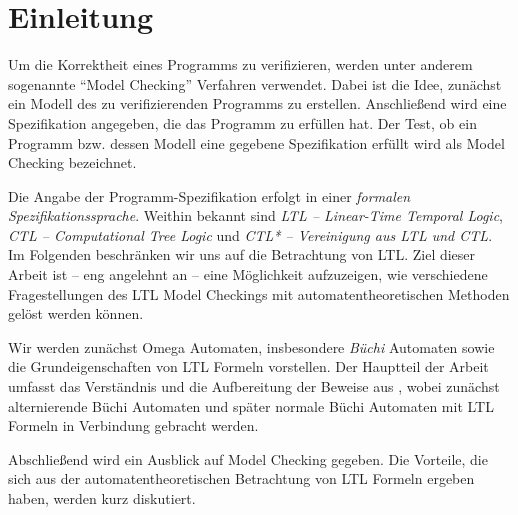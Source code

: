 \section{Einleitung}

Um die Korrektheit eines Programms zu verifizieren, werden unter anderem sogenannte "`Model Checking"' Verfahren verwendet. Dabei ist die Idee, zunächst ein Modell des zu verifizierenden Programms zu erstellen. Anschließend wird eine Spezifikation angegeben, die das Programm zu erfüllen hat. Der Test, ob ein Programm bzw. dessen Modell eine gegebene Spezifikation erfüllt wird als Model Checking bezeichnet.

Die Angabe der Programm-Spezifikation erfolgt in einer \textit{formalen Spezifikationssprache}. Weithin bekannt sind \textit{LTL -- Linear-Time Temporal Logic}, \textit{CTL -- Computational Tree Logic} und \textit{CTL* -- Vereinigung aus LTL und CTL}. Im Folgenden beschränken wir uns auf die Betrachtung von LTL. Ziel dieser Arbeit ist -- eng angelehnt an \cite{vardi+96} -- eine Möglichkeit aufzuzeigen, wie verschiedene Fragestellungen des LTL Model Checkings mit automatentheoretischen Methoden gelöst werden können. 

Wir werden zunächst Omega Automaten, insbesondere \textit{Büchi} Automaten sowie die Grundeigenschaften von LTL Formeln vorstellen. Der Hauptteil der Arbeit umfasst das Verständnis und die Aufbereitung der Beweise aus \cite{vardi+96}, wobei zunächst alternierende Büchi Automaten und später normale Büchi Automaten mit LTL Formeln in Verbindung gebracht werden.

Abschließend wird ein Ausblick auf Model Checking gegeben. Die Vorteile, die sich aus der automatentheoretischen Betrachtung von LTL Formeln ergeben haben, werden kurz diskutiert.